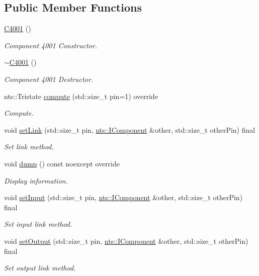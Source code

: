 \subsection*{Public Member Functions}
\begin{DoxyCompactItemize}
\item 
\mbox{\hyperlink{classC4001_a3d1e79c23128b34f32bd941682ea2e66}{C4001}} ()
\begin{DoxyCompactList}\small\item\em Component 4001 Constructor. \end{DoxyCompactList}\item 
\mbox{\label{classC4001_a22bee99372f97c18a9335ef398c9cc51}} 
\mbox{\hyperlink{classC4001_a22bee99372f97c18a9335ef398c9cc51}{$\sim$\+C4001}} ()
\begin{DoxyCompactList}\small\item\em Component 4001 Destructor. \end{DoxyCompactList}\item 
nts\+::\+Tristate \mbox{\hyperlink{classC4001_a2f3b7d19b418d8fbcfe08ed94b6a3e3a}{compute}} (std\+::size\+\_\+t pin=1) override
\begin{DoxyCompactList}\small\item\em Compute. \end{DoxyCompactList}\item 
void \mbox{\hyperlink{classC4001_acd977a0811ba00a202d346e551348f46}{set\+Link}} (std\+::size\+\_\+t pin, \mbox{\hyperlink{classnts_1_1IComponent}{nts\+::\+I\+Component}} \&other, std\+::size\+\_\+t other\+Pin) final
\begin{DoxyCompactList}\small\item\em Set link method. \end{DoxyCompactList}\item 
void \mbox{\hyperlink{classC4001_a2c2b7a726830f95515ce5538c1508b1f}{dump}} () const noexcept override
\begin{DoxyCompactList}\small\item\em Display information. \end{DoxyCompactList}\item 
void \mbox{\hyperlink{classC4001_a6cd7ce77dbd4bba7cbbdca0bc14cdb3b}{set\+Input}} (std\+::size\+\_\+t pin, \mbox{\hyperlink{classnts_1_1IComponent}{nts\+::\+I\+Component}} \&other, std\+::size\+\_\+t other\+Pin) final
\begin{DoxyCompactList}\small\item\em Set input link method. \end{DoxyCompactList}\item 
void \mbox{\hyperlink{classC4001_a6fc874b1c8f66481441214e6adc473fd}{set\+Output}} (std\+::size\+\_\+t pin, \mbox{\hyperlink{classnts_1_1IComponent}{nts\+::\+I\+Component}} \&other, std\+::size\+\_\+t other\+Pin) final
\begin{DoxyCompactList}\small\item\em Set output link method. \end{DoxyCompactList}\end{DoxyCompactItemize}
